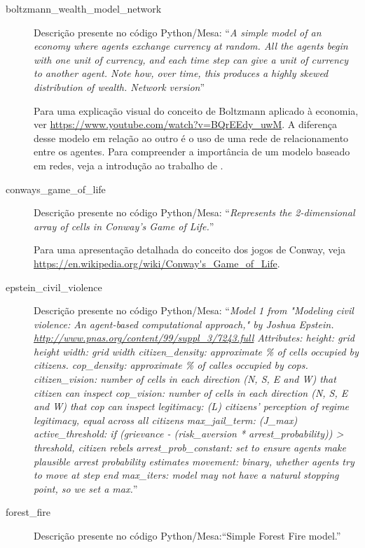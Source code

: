 \begin{description}
\item [boltzmann\_wealth\_model\_network]

Descrição presente no código Python/Mesa: ``\textit{A simple model of an economy where agents exchange currency at random. All the agents begin with one unit of currency, and each time step can give a unit of currency to another agent. Note how, over time, this produces a highly skewed distribution of wealth. Network version}''

Para uma explicação visual do conceito de Boltzmann aplicado à economia, ver \url{https://www.youtube.com/watch?v=BQrEEdy_uwM}.
A diferença desse modelo em relação ao outro é o uso de uma rede de relacionamento entre os agentes. Para compreender a importância de um modelo baseado em redes, veja a introdução ao trabalho de \citet{pareschi_wealth_2014}.

\item [conways\_game\_of\_life] 

Descrição presente no código Python/Mesa: ``\textit{Represents the 2-dimensional array of cells in Conway's Game of Life.}''

Para uma apresentação detalhada do conceito dos jogos de Conway, veja \url{https://en.wikipedia.org/wiki/Conway's_Game_of_Life}.

\item [epstein\_civil\_violence] 

Descrição presente no código Python/Mesa: ``\textit{Model 1 from "Modeling civil violence: An agent-based computational approach," by Joshua Epstein. \url{http://www.pnas.org/content/99/suppl_3/7243.full} Attributes: height: grid height width: grid width citizen\_density: approximate \% of cells occupied by citizens. cop\_density: approximate \% of calles occupied by cops. citizen\_vision: number of cells in each direction (N, S, E and W) that citizen can inspect cop\_vision: number of cells in each direction (N, S, E and W) that cop can inspect legitimacy: (L) citizens' perception of regime legitimacy, equal across all citizens max\_jail\_term: (J\_max) active\_threshold: if (grievance - (risk\_aversion * arrest\_probability)) > threshold, citizen rebels arrest\_prob\_constant: set to ensure agents make plausible arrest probability estimates movement: binary, whether agents try to move at step end max\_iters: model may not have a natural stopping point, so we set a max.}''


\item [forest\_fire] 

Descrição presente no código Python/Mesa:``Simple Forest Fire model.''


\end{description}
